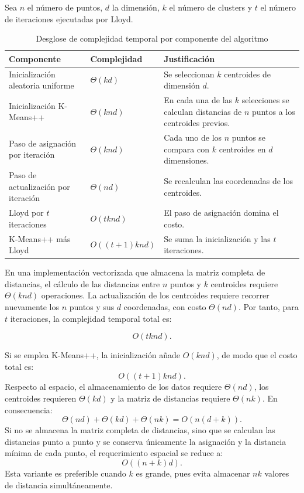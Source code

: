 \documentclass[11pt,letterpaper]{article}
\numberwithin{equation}{section}
\theoremstyle{plain}
\begin{document}
Sea $n$ el número de puntos, $d$ la dimensión, $k$ el número de clusters y $t$ el número de iteraciones ejecutadas por Lloyd.

\begin{table}[t]
\centering
\small
\caption{Desglose de complejidad temporal por componente del algoritmo}
\label{tab:complejidad}
\begin{tabularx}{\textwidth}{@{}>{\raggedright\arraybackslash}p{4.6cm} l >{\raggedright\arraybackslash}X@{}}
\toprule
\rowcolor{azulclaro}
\textbf{Componente} & \textbf{Complejidad} & \textbf{Justificación} \\
\midrule
Inicialización aleatoria uniforme & $\Theta(kd)$ & Se seleccionan $k$ centroides de dimensión $d$. \\
Inicialización K-Means++ & $\Theta(knd)$ & En cada una de las $k$ selecciones se calculan distancias de $n$ puntos a los centroides previos. \\
Paso de asignación por iteración & $\Theta(knd)$ & Cada uno de los $n$ puntos se compara con $k$ centroides en $d$ dimensiones. \\
Paso de actualización por iteración & $\Theta(nd)$ & Se recalculan las coordenadas de los centroides. \\
Lloyd por $t$ iteraciones & $O(tknd)$ & El paso de asignación domina el costo. \\
K-Means++ más Lloyd & $O((t+1)knd)$ & Se suma la inicialización y las $t$ iteraciones. \\
\bottomrule
\end{tabularx}
\end{table}

En una implementación vectorizada que almacena la matriz completa de distancias, el cálculo de las distancias entre $n$ puntos y $k$ centroides requiere $\Theta(knd)$ operaciones. La actualización de los centroides requiere recorrer nuevamente los $n$ puntos y sus $d$ coordenadas, con costo $\Theta(nd)$. Por tanto, para $t$ iteraciones, la complejidad temporal total es:
\begin{resultado}
\begin{equation}\label{eq:tiempo}
O(tknd).
\end{equation}
\end{resultado}
Si se emplea K-Means++, la inicialización añade $O(knd)$, de modo que el costo total es:
\begin{equation}
O((t+1)knd).
\end{equation}
Respecto al espacio, el almacenamiento de los datos requiere $\Theta(nd)$, los centroides requieren $\Theta(kd)$ y la matriz de distancias requiere $\Theta(nk)$. En consecuencia:
\begin{equation}
\Theta(nd) + \Theta(kd) + \Theta(nk) = O(n(d+k)).
\end{equation}
Si no se almacena la matriz completa de distancias, sino que se calculan las distancias punto a punto y se conserva únicamente la asignación y la distancia mínima de cada punto, el requerimiento espacial se reduce a:
\begin{equation}
O((n+k)d).
\end{equation}
Esta variante es preferible cuando $k$ es grande, pues evita almacenar $nk$ valores de distancia simultáneamente.
\end{document}

